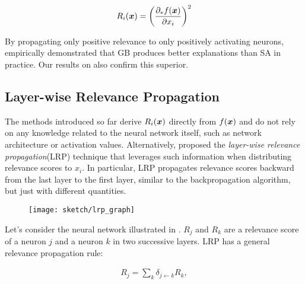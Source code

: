 \begin{align*}
	R_i(\x) = \bigg( \frac{ \partial_* f(\patvector{x}) }{ \partial x_i }  \bigg)^2
\end{align*}

By propagating only positive relevance to only positively activating neurons, \citet{SpringenbergStrivingSimplicityAll2015a} empirically demonstrated that GB produces better explanations than SA in practice. Our results on \addfigure{\ref{fig:lenet_heatmaps}} also confirm this superior.
%

\subsection{Layer-wise Relevance Propagation}
The methods introduced so far derive $R_i(\boldsymbol{x})$ directly from $f(\patvector{x})$ and do not rely on any knowledge related to the neural network itself, such as network architecture or activation values. Alternatively, \citet{BachPixelWiseExplanationsNonLinear2015} proposed the \textit{layer-wise relevance propagation}(LRP) technique that leverages such information when distributing relevance scores to $x_i$. In particular, LRP propagates relevance scores backward from the last layer to the first layer, similar to the backpropagation algorithm, but just with different quantities.




 \begin{figure}
	\begin{center}
		\texttt{[image: sketch/lrp\_graph]}
		\label{fig:lrp_graph}
	\end{center}
\end{figure}

Let's consider the neural network illustrated in \addfigure{\ref{fig:lrp_graph}}. $R_j$ and $R_k$ are a relevance score of  a neuron $j$ and a neuron $k$ in two successive layers.  LRP has a general relevance propagation rule:

\begin{align} \label{eq:general_lrp_rj}
	R_j = \sum_{k} 	\delta_{j\leftarrow k} R_{k} ,
\end{align}

